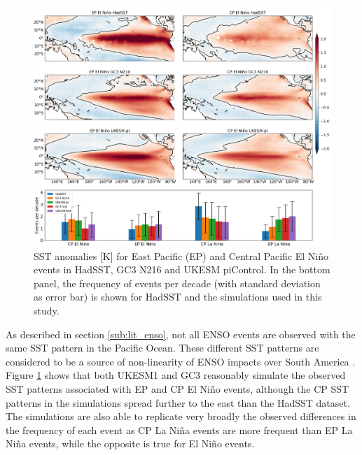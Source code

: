 \begin{figure}[t!]
\includegraphics[width=\linewidth]{figures/epcpmap}
\caption[Diversity of ENSO SST patterns]{SST anomalies [K] for East Pacific (EP) and Central Pacific El Niño events in HadSST, GC3 N216 and UKESM piControl.  In the bottom panel, the frequency of events per decade (with standard deviation as error bar) is shown for HadSST and the simulations used in this study.
}
\label{fig:s1}
\end{figure}


  
As described in section \ref{sub:lit_enso}, not all ENSO events are observed with the same SST  pattern in the Pacific Ocean. These different SST patterns are considered to be a source of non-linearity of ENSO impacts over South America \citep{sulca2018,cai2020}.
Figure \ref{fig:s1} shows that both UKESM1 and GC3 reasonably simulate the observed SST patterns associated with EP and CP El Niño events, although the CP SST patterns in the simulations spread further to the east than the HadSST dataset.
The simulations are also able to replicate very broadly the observed differences in the frequency of each event as CP La Niña events are more frequent than EP La Niña events, while the opposite is true for El Niño events.

